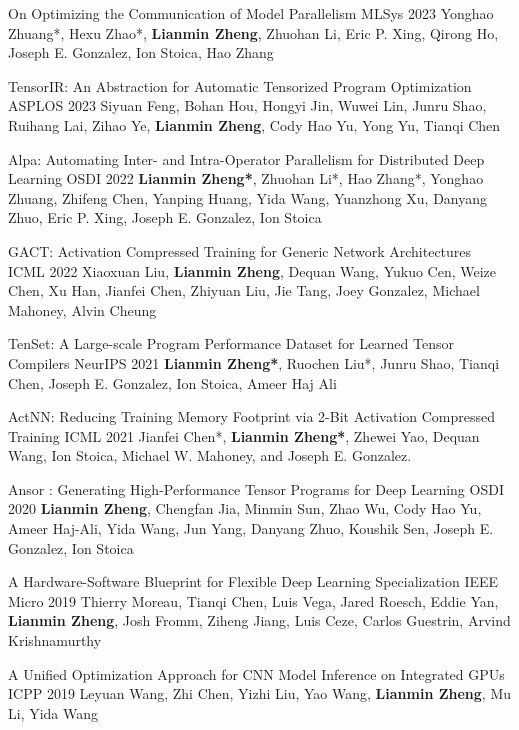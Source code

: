 \begin{cventries}
\cventry
{}
{On Optimizing the Communication of Model Parallelism} %
{MLSys 2023} %
{} %
{Yonghao Zhuang*, Hexu Zhao*, \textbf{Lianmin Zheng}, Zhuohan Li, Eric P. Xing, Qirong Ho, Joseph E. Gonzalez, Ion Stoica, Hao Zhang}

\cventry
{}
{TensorIR: An Abstraction for Automatic Tensorized Program Optimization} %
{ASPLOS 2023} %
{} %
{Siyuan Feng, Bohan Hou, Hongyi Jin, Wuwei Lin, Junru Shao, Ruihang Lai, Zihao Ye, \textbf{Lianmin Zheng}, Cody Hao Yu, Yong Yu, Tianqi Chen}

\cventry
{}
{Alpa: Automating Inter- and Intra-Operator Parallelism for Distributed Deep Learning} %
{OSDI 2022} %
{} %
{\textbf{Lianmin Zheng*}, Zhuohan Li*, Hao Zhang*, Yonghao Zhuang, Zhifeng Chen, Yanping Huang, Yida Wang, Yuanzhong Xu, Danyang Zhuo, Eric P. Xing, Joseph E. Gonzalez, Ion Stoica}

\cventry
{}
{GACT: Activation Compressed Training for Generic Network Architectures} %
{ICML 2022} %
{} %
{Xiaoxuan Liu, \textbf{Lianmin Zheng}, Dequan Wang, Yukuo Cen, Weize Chen, Xu Han, Jianfei Chen, Zhiyuan Liu, Jie Tang, Joey Gonzalez, Michael Mahoney, Alvin Cheung}

\cventry
{}
{TenSet: A Large-scale Program Performance Dataset for Learned Tensor Compilers} %
{NeurIPS 2021} %
{} %
{\textbf{Lianmin Zheng*}, Ruochen Liu*, Junru Shao, Tianqi Chen, Joseph E. Gonzalez, Ion Stoica, Ameer Haj Ali}

\cventry
{}
{ActNN: Reducing Training Memory Footprint via 2-Bit Activation Compressed Training} %
{ICML 2021} %
{} %
{Jianfei Chen*, \textbf{Lianmin Zheng*}, Zhewei Yao, Dequan Wang, Ion Stoica, Michael W. Mahoney, and Joseph E. Gonzalez.}

\cventry
{}
{Ansor : Generating High-Performance Tensor Programs for Deep Learning} %
{OSDI 2020} %
{} %
{\textbf{Lianmin Zheng}, Chengfan Jia, Minmin Sun, Zhao Wu, Cody Hao Yu, Ameer Haj-Ali, Yida Wang, Jun Yang, Danyang Zhuo, Koushik Sen, Joseph E. Gonzalez, Ion Stoica}

\cventry
{}
{A Hardware-Software Blueprint for Flexible Deep Learning Specialization} %
{IEEE Micro 2019} %
{} %
{Thierry Moreau, Tianqi Chen, Luis Vega, Jared Roesch, Eddie Yan, \textbf{Lianmin Zheng}, Josh Fromm, Ziheng Jiang, Luis Ceze, Carlos Guestrin, Arvind Krishnamurthy}

\cventry
{}
{A Unified Optimization Approach for CNN Model Inference on Integrated GPUs} %
{ICPP 2019} %
{} %
{Leyuan Wang, Zhi Chen, Yizhi Liu, Yao Wang, \textbf{Lianmin Zheng}, Mu Li, Yida Wang}


\end{cventries}
